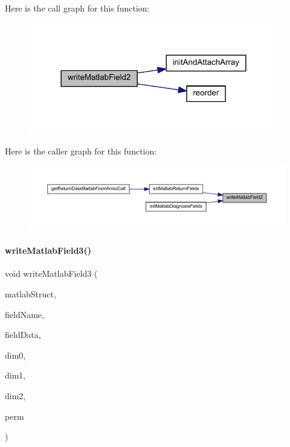 Here is the call graph for this function\+:
\nopagebreak
\begin{figure}[H]
\begin{center}
\leavevmode
\includegraphics[width=309pt]{namespaceamici_aab2bcdb74e3b44bb65e12b14d3ffb42b_cgraph}
\end{center}
\end{figure}
Here is the caller graph for this function\+:
\nopagebreak
\begin{figure}[H]
\begin{center}
\leavevmode
\includegraphics[width=350pt]{namespaceamici_aab2bcdb74e3b44bb65e12b14d3ffb42b_icgraph}
\end{center}
\end{figure}
\mbox{\label{namespaceamici_a1d198c062d2612631b6c2b0fe31e0cd4}} 
\paragraph{\texorpdfstring{writeMatlabField3()}{writeMatlabField3()}}
{\footnotesize\ttfamily void write\+Matlab\+Field3 (\begin{DoxyParamCaption}\item[{mx\+Array $\ast$}]{matlab\+Struct,  }\item[{const char $\ast$}]{field\+Name,  }\item[{std\+::vector$<$ T $>$ const \&}]{field\+Data,  }\item[{int}]{dim0,  }\item[{int}]{dim1,  }\item[{int}]{dim2,  }\item[{std\+::vector$<$ int $>$}]{perm }\end{DoxyParamCaption})}

